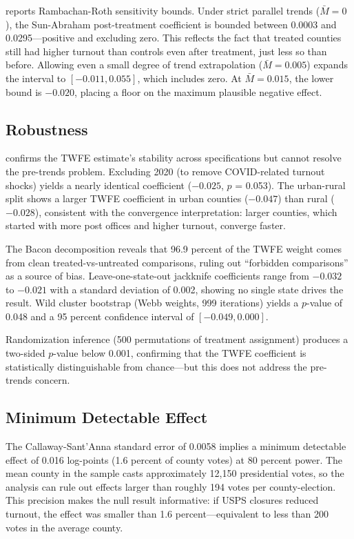 \documentclass[12pt]{article}
\begin{document}


 reports Rambachan-Roth sensitivity bounds. Under strict parallel trends ($\bar{M} = 0$), the Sun-Abraham post-treatment coefficient is bounded between 0.0003 and 0.0295---positive and excluding zero. This reflects the fact that treated counties still had higher turnout than controls even after treatment, just less so than before. Allowing even a small degree of trend extrapolation ($\bar{M} = 0.005$) expands the interval to $[-0.011, 0.055]$, which includes zero. At $\bar{M} = 0.015$, the lower bound is $-0.020$, placing a floor on the maximum plausible negative effect.

\subsection{Robustness}



 confirms the TWFE estimate's stability across specifications but cannot resolve the pre-trends problem. Excluding 2020 (to remove COVID-related turnout shocks) yields a nearly identical coefficient ($-0.025$, $p$ = 0.053). The urban-rural split shows a larger TWFE coefficient in urban counties ($-0.047$) than rural ($-0.028$), consistent with the convergence interpretation: larger counties, which started with more post offices and higher turnout, converge faster.

The Bacon decomposition reveals that 96.9 percent of the TWFE weight comes from clean treated-vs-untreated comparisons, ruling out ``forbidden comparisons'' as a source of bias. Leave-one-state-out jackknife coefficients range from $-0.032$ to $-0.021$ with a standard deviation of 0.002, showing no single state drives the result. Wild cluster bootstrap (Webb weights, 999 iterations) yields a $p$-value of 0.048 and a 95 percent confidence interval of $[-0.049, 0.000]$.

Randomization inference (500 permutations of treatment assignment) produces a two-sided $p$-value below 0.001, confirming that the TWFE coefficient is statistically distinguishable from chance---but this does not address the pre-trends concern.

\subsection{Minimum Detectable Effect}

The Callaway-Sant'Anna standard error of 0.0058 implies a minimum detectable effect of 0.016 log-points (1.6 percent of county votes) at 80 percent power. The mean county in the sample casts approximately 12,150 presidential votes, so the analysis can rule out effects larger than roughly 194 votes per county-election. This precision makes the null result informative: if USPS closures reduced turnout, the effect was smaller than 1.6 percent---equivalent to less than 200 votes in the average county.
\end{document}
